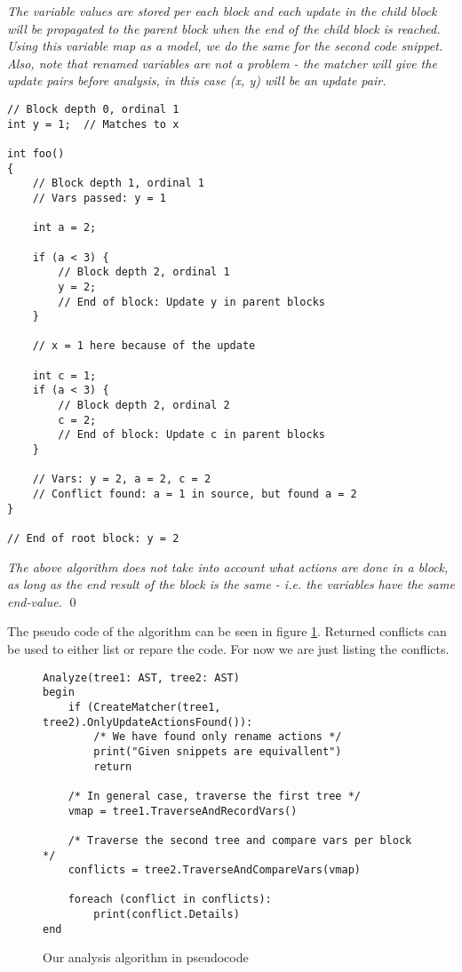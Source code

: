 \begin{exmp}
\bigskip
\textit{The variable values are stored per each block and each update in the child block will be propagated to the parent block when the end of the child block is reached. Using this variable map as a model, we do the same for the second code snippet. Also, note that renamed variables are not a problem - the matcher will give the update pairs before analysis, in this case (x, y) will be an update pair.}
\bigskip

\begin{lstlisting}
// Block depth 0, ordinal 1
int y = 1;  // Matches to x

int foo()
{
    // Block depth 1, ordinal 1
    // Vars passed: y = 1

    int a = 2;

    if (a < 3) {
        // Block depth 2, ordinal 1
        y = 2;
        // End of block: Update y in parent blocks
    }

    // x = 1 here because of the update

    int c = 1;
    if (a < 3) {
        // Block depth 2, ordinal 2
        c = 2;
        // End of block: Update c in parent blocks
    }

    // Vars: y = 2, a = 2, c = 2
    // Conflict found: a = 1 in source, but found a = 2
}

// End of root block: y = 2
\end{lstlisting}

\bigskip
\textit{The above algorithm does not take into account what actions are done in a block, as long as the end result of the block is the same - i.e. the variables have the same end-value.}
\qed
\end{exmp}

The pseudo code of the algorithm can be seen in figure \ref{fig:WhileAST}. Returned conflicts can be used to either list or repare the code. For now we are just listing the conflicts.

\begin{figure}[H]
\centering
\begin{lstlisting}
Analyze(tree1: AST, tree2: AST)
begin
    if (CreateMatcher(tree1, tree2).OnlyUpdateActionsFound()):
        /* We have found only rename actions */
        print("Given snippets are equivallent")
        return

    /* In general case, traverse the first tree */
    vmap = tree1.TraverseAndRecordVars()

    /* Traverse the second tree and compare vars per block */
    conflicts = tree2.TraverseAndCompareVars(vmap)

    foreach (conflict in conflicts):
        print(conflict.Details)
end
\end{lstlisting}
\caption{Our analysis algorithm in pseudocode}
\label{fig:WhileAST}
\end{figure}
